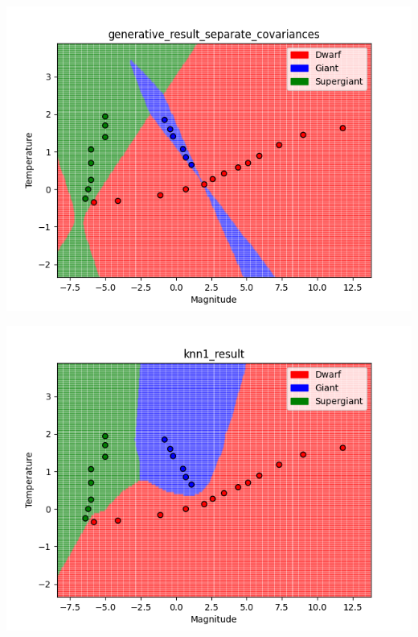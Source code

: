 \documentclass[submit]{harvardml}
\begin{document}
\begin{enumerate}
        \begin{center}
            \includegraphics[scale=0.5]{solutions/generative_result_separate_covariances.png}
        \end{center}

        \begin{center}
            \includegraphics[scale=0.5]{solutions/knn1_result.png}
        \end{center}


\end{enumerate}
\end{document}
